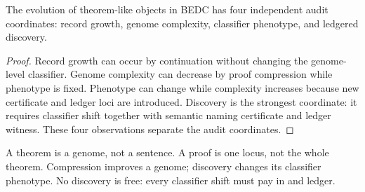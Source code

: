 \begin{theorem}
\label{thm:theorem-genome-evolution}
The evolution of theorem-like objects in BEDC has four independent audit
coordinates: record growth, genome complexity, classifier phenotype, and
ledgered discovery.
\end{theorem}
\begin{proof}
Record growth can occur by continuation without changing the genome-level
classifier. Genome complexity can decrease by proof compression while phenotype
is fixed. Phenotype can change while complexity increases because new
certificate and ledger loci are introduced. Discovery is the strongest
coordinate: it requires classifier shift together with semantic naming
certificate and ledger witness. These four observations separate the audit
coordinates.
\end{proof}

\begin{principle}
\label{prin:theorem-genome-slogan}
A theorem is a genome, not a sentence. A proof is one locus, not the whole
theorem. Compression improves a genome; discovery changes its classifier
phenotype. No discovery is free: every classifier shift must pay in
\NameCert{} and ledger.
\end{principle}

